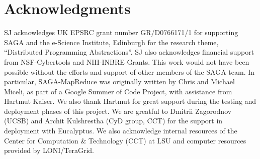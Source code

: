 \documentclass[conference,final]{IEEEtran}
\newcommand{\sagamapreduce }{SAGA-MapReduce }
\begin{document}





\section{Acknowledgments}

SJ acknowledges UK EPSRC grant number GR/D0766171/1 for supporting
SAGA and the e-Science Institute, Edinburgh for the research theme,
``Distributed Programming Abstractions''.  SJ also acknowledges
financial support from NSF-Cybertools and NIH-INBRE Grants. This work
would not have been possible without the efforts and support of other
members of the SAGA team.  In particular, \sagamapreduce was
originally written by Chris and Michael Miceli, as part of a Google
Summer of Code Project, with assistance from Hartmut Kaiser. We also
thank Hartmut for great support during the testing and deployment
phases of this project. We are greatful to Dmitrii Zagorodnov (UCSB)
and Archit Kulshrestha (CyD group, CCT) for the support in deployment
with Eucalyptus.  We also acknowledge internal resources of the Center
for Computation \& Technology (CCT) at LSU and computer resources
provided by LONI/TeraGrid.  

\end{document}

